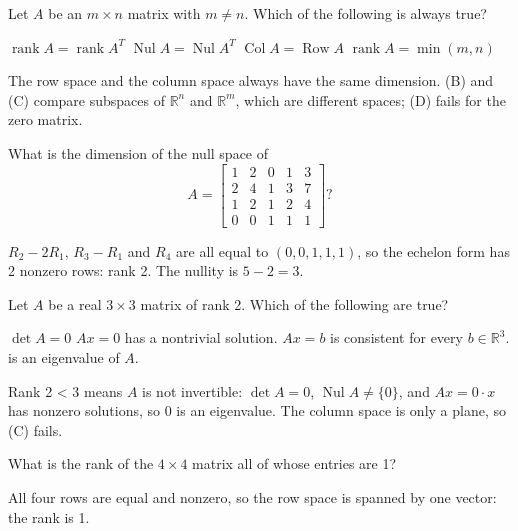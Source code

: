 \begin{question}[id=rank-3, marks=2]
Let $A$ be an $m \times n$ matrix with $m \ne n$. Which of the following is always true?
\begin{options}
  \correct $\operatorname{rank} A = \operatorname{rank} A^T$
  \option $\operatorname{Nul} A = \operatorname{Nul} A^T$
  \option $\operatorname{Col} A = \operatorname{Row} A$
  \option $\operatorname{rank} A = \min(m, n)$
\end{options}
\begin{solution}
The row space and the column space always have the same dimension. (B) and (C) compare subspaces of $\mathbb{R}^n$ and $\mathbb{R}^m$, which are different spaces; (D) fails for the zero matrix.
\end{solution}
\end{question}

\begin{question}[id=rank-4, marks=2]
What is the dimension of the null space of
\[
  A = \begin{bmatrix} 1 & 2 & 0 & 1 & 3 \\ 2 & 4 & 1 & 3 & 7 \\ 1 & 2 & 1 & 2 & 4 \\ 0 & 0 & 1 & 1 & 1 \end{bmatrix}?
\]
\begin{solution}
$R_2 - 2R_1$, $R_3 - R_1$ and $R_4$ are all equal to $(0, 0, 1, 1, 1)$, so the echelon form has 2 nonzero rows: rank 2. The nullity is $5 - 2 = 3$.
\end{solution}
\end{question}

\begin{question}[id=rank-5, type=msq, marks=2]
Let $A$ be a real $3 \times 3$ matrix of rank 2. Which of the following are true?
\begin{options}
  \correct $\det A = 0$
  \correct $Ax = 0$ has a nontrivial solution.
  \option $Ax = b$ is consistent for every $b \in \mathbb{R}^3$.
   is an eigenvalue of $A$.
\end{options}
\begin{solution}
Rank 2 < 3 means $A$ is not invertible: $\det A = 0$, $\operatorname{Nul} A \ne \{0\}$, and $Ax = 0\cdot x$ has nonzero solutions, so 0 is an eigenvalue. The column space is only a plane, so (C) fails.
\end{solution}
\end{question}

\begin{question}[id=rank-6]
What is the rank of the $4 \times 4$ matrix all of whose entries are 1?
\begin{solution}
All four rows are equal and nonzero, so the row space is spanned by one vector: the rank is 1.
\end{solution}
\end{question}


